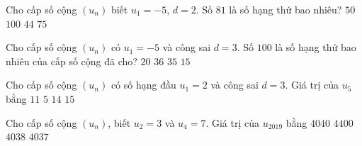 \begin{ex}%
	Cho cấp số cộng $(u_n)$ biết $u_1=-5$, $d=2$. Số $81$ là số hạng thứ bao nhiêu?
	\choice
	{$50$}
	{$100$}
	{\True $44$}
	{$75$}
\end{ex}%
\begin{ex}%
Cho cấp số cộng $(u_n)$ có $u_1=-5$ và công sai $d=3$. Số $100$ là số hạng thứ bao nhiêu của cấp số cộng đã cho?
\choice
{$20$}
{\True $36$}
{$35$}
{$15$}
\end{ex}%
\begin{ex}%
Cho cấp số cộng $(u_n)$ có số hạng đầu $u_1=2$ và công sai $d=3$. Giá trị của $u_5$ bằng
\choice
{$11$}
{$5$}
{\True $14$}
{$15$}
\end{ex}%
\begin{ex}%
	Cho cấp số cộng $(u_n)$, biết $u_2 = 3$ và $u_4 = 7$. Giá trị của $u_{2019}$ bằng
	\choice
	{$ 4040 $}
	{$ 4400 $}
	{$ 4038 $}
	{\True $ 4037 $}
\end{ex}%

